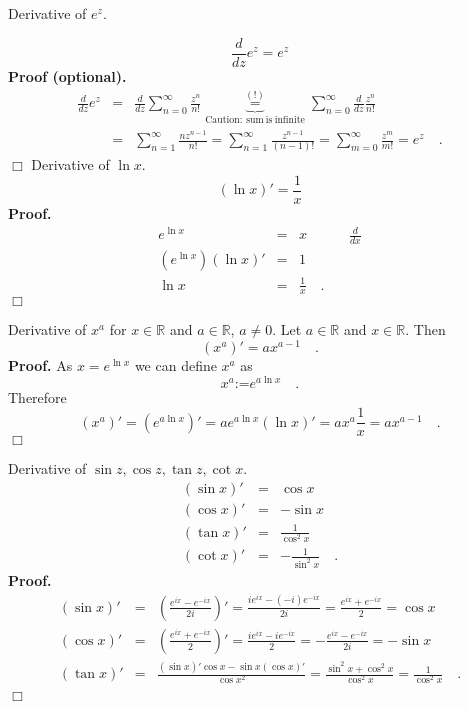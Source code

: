 \documentclass[12pt]{book}
\newcommand{\eqdef}{\textbf{:=}}
\newcommand{\eqAttention}{\stackrel{(!)}{=}}
\newcommand{\importantFormula}[1]{\begin{equation} \boxed{#1} \end{equation}}
\newenvironment{proof}[1][]{ \textbf{Proof#1.} }{$\Box$\medskip}
\newenvironment{proofOptional}[1][]{ \textbf{Proof (optional).}}{$\Box$\medskip}
\begin{document}
Derivative of $e^z$.

\importantFormula{
\frac{d}{d z} e^z= e^z
}
\begin{proofOptional}
\[\begin{array}{rcl}
\frac{d}{dz}e^z &=&\frac{d}{dz}\sum_{n=0}^{\infty} \frac{z^n}{n!} \underbrace{\eqAttention}_{\mathrm{Caution:~sum~is~infinite}} \sum_{n=0}^{\infty} \frac{d}{dz} \frac{z^n}{n!}\\&=&\sum_{n=1}^{\infty} \frac {nz^{n-1}}{n!}= \sum_{n=1}^{\infty} \frac {z^{n-1}}{(n-1)!} =  \sum_{m=0}^{\infty} \frac {z^{m}}{m!}=e^z\quad .
\end{array}
\]
\end{proofOptional}
Derivative of $\ln x$.
\[
(\ln x)' = \frac{1}x 
\]
\begin{proof}
\[
\begin{array}{rcl}
e^{\ln x}&=& x  \quad \quad \quad \frac {d}{dx}\\
(e^{\ln x})(\ln x)' &= &1\\
 \ln x&=&\frac{1}x\quad .
\end{array}
\]
\end{proof}

Derivative of $x^a$ for $x\in \mathbb R$ and $a\in \mathbb R$, $a\neq 0$. Let $a\in \mathbb R$ and $x\in \mathbb R$. Then
\begin{equation}\label{eqXtotheAthDerivative}
(x^a)'=ax^{a-1}\quad .
\end{equation}
\begin{proof} As $x=e^{\ln x}$ we can define $x^a$ as
\[
x^a\eqdef  e^{a\ln x}\quad .
\]
Therefore 
\[
(x^{a})'=(e^{a\ln x})'=ae^{a\ln x} (\ln x)' =a x^{a}\frac{1}{x} = ax^{a-1} \quad .
\]
\end{proof}

Derivative of $\sin z, \cos z, \tan z, \cot x$.
\[
\begin{array}{rcl}
(\sin x)'&=&\cos x\\
(\cos x)'&=&-\sin x\\
(\tan x)'&=&\frac{1}{\cos ^2 x}\\
(\cot x)'&=&-\frac{1}{\sin ^2 x}\quad .
\end{array}
\]
\begin{proof}
\[
\begin{array}{rcl}
(\sin x)'&=&\left(\frac{e^{ix}-e^{-ix}}{2i}\right)'=\frac{ie^{ix}-(-i)e^{-ix}}{2i}=\frac{e^{ix}+e^{-ix}}2=\cos x\\
(\cos x)'&=&\left(\frac{e^{ix}+e^{-ix}}{2}\right)'=\frac{ie^{ix}-ie^{-ix}}{2}=-\frac{e^{ix}-e^{-ix}}{2i}=-\sin x \\
(\tan x)'&=&\frac{(\sin x)'\cos x- \sin x (\cos x)'}{\cos x^{2}}=\frac{\sin^2x+\cos^2x}{\cos^2x}=\frac{1}{\cos^2x} \quad .\\
\end{array}
\]
\end{proof}
\end{document}
